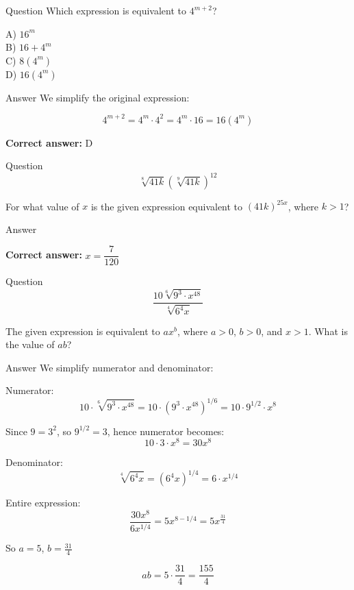 \documentclass{beamer}
\begin{document}
\begin{frame}{Question}
Which expression is equivalent to $4^{m+2}$?

A) $16^m$ \\
B) $16 + 4^m$ \\
C) $8(4^m)$ \\
D) $16(4^m)$
\end{frame}


\begin{frame}{Answer}
We simplify the original expression:

\[
4^{m+2} = 4^m \cdot 4^2 = 4^m \cdot 16 = 16(4^m)
\]

\textbf{Correct answer:} D
\end{frame}

\begin{frame}{Question}
\[
\sqrt[8]{41k} \left( \sqrt[9]{41k} \right)^{12}
\]

For what value of $x$ is the given expression equivalent to $(41k)^{25x}$, where $k > 1$?
\end{frame}

\begin{frame}{Answer}


\textbf{Correct answer:} $x = \dfrac{7}{120}$
\end{frame}

\begin{frame}{Question}
\[
\frac{10 \sqrt[6]{9^3 \cdot x^{48}}}{\sqrt[4]{6^4 x}}
\]

The given expression is equivalent to $a x^b$, where $a > 0$, $b > 0$, and $x > 1$. What is the value of $ab$?
\end{frame}

\begin{frame}{Answer}
We simplify numerator and denominator:

Numerator:
\[
10 \cdot \sqrt[6]{9^3 \cdot x^{48}} = 10 \cdot (9^3 \cdot x^{48})^{1/6} = 10 \cdot 9^{1/2} \cdot x^8
\]

Since $9 = 3^2$, so $9^{1/2} = 3$, hence numerator becomes:
\[
10 \cdot 3 \cdot x^8 = 30x^8
\]

Denominator:
\[
\sqrt[4]{6^4 x} = (6^4 x)^{1/4} = 6 \cdot x^{1/4}
\]

Entire expression:
\[
\frac{30x^8}{6x^{1/4}} = 5x^{8 - 1/4} = 5x^{\frac{31}{4}}
\]

So $a = 5$, $b = \frac{31}{4}$

\[
ab = 5 \cdot \frac{31}{4} = \frac{155}{4}
\]


\end{frame}
\end{document}
